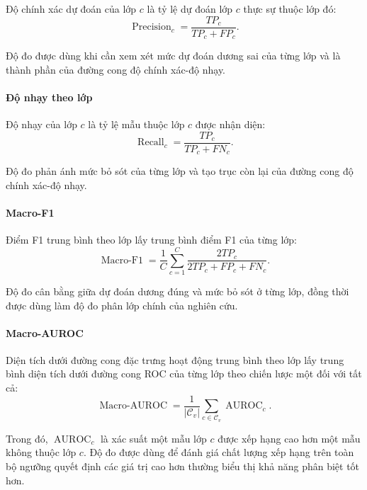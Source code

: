 Độ chính xác dự đoán của lớp $c$ là tỷ lệ dự đoán lớp $c$ thực sự thuộc lớp đó:
\begin{equation}
\operatorname{Precision}_c=\frac{TP_c}{TP_c+FP_c}.
\label{eq:ch4_precision_def}
\end{equation}

Độ đo được dùng khi cần xem xét mức dự đoán dương sai của từng lớp và là thành phần của đường cong độ chính xác-độ nhạy.

\clearpage

\paragraph{Độ nhạy theo lớp}

Độ nhạy của lớp $c$ là tỷ lệ mẫu thuộc lớp $c$ được nhận diện:
\begin{equation}
\operatorname{Recall}_c=\frac{TP_c}{TP_c+FN_c}.
\label{eq:ch4_recall_def}
\end{equation}

Độ đo phản ánh mức bỏ sót của từng lớp và tạo trục còn lại của đường cong độ chính xác-độ nhạy.

\paragraph{Macro-F1}

Điểm F1 trung bình theo lớp lấy trung bình điểm F1 của từng lớp:
\begin{equation}
\operatorname{Macro\text{-}F1}
=\frac{1}{C}\sum_{c=1}^{C}\frac{2TP_c}{2TP_c+FP_c+FN_c}.
\label{eq:ch4_macro_f1}
\end{equation}

Độ đo cân bằng giữa dự đoán dương đúng và mức bỏ sót ở từng lớp, đồng thời được dùng làm độ đo phân lớp chính của nghiên cứu.

\paragraph{Macro-AUROC}

Diện tích dưới đường cong đặc trưng hoạt động trung bình theo lớp \cite{Fawcett2006ROC} lấy trung bình diện tích dưới đường cong ROC của từng lớp theo chiến lược một đối với tất cả:
\begin{equation}
\operatorname{Macro\text{-}AUROC}
=\frac{1}{|\mathcal{C}_v|}\sum_{c\in\mathcal{C}_v}\operatorname{AUROC}_c.
\label{eq:ch4_macro_auroc}
\end{equation}

Trong đó, $\operatorname{AUROC}_c$ là xác suất một mẫu lớp $c$ được xếp hạng cao hơn một mẫu không thuộc lớp $c$. Độ đo được dùng để đánh giá chất lượng xếp hạng trên toàn bộ ngưỡng quyết định các giá trị cao hơn thường biểu thị khả năng phân biệt tốt hơn.


